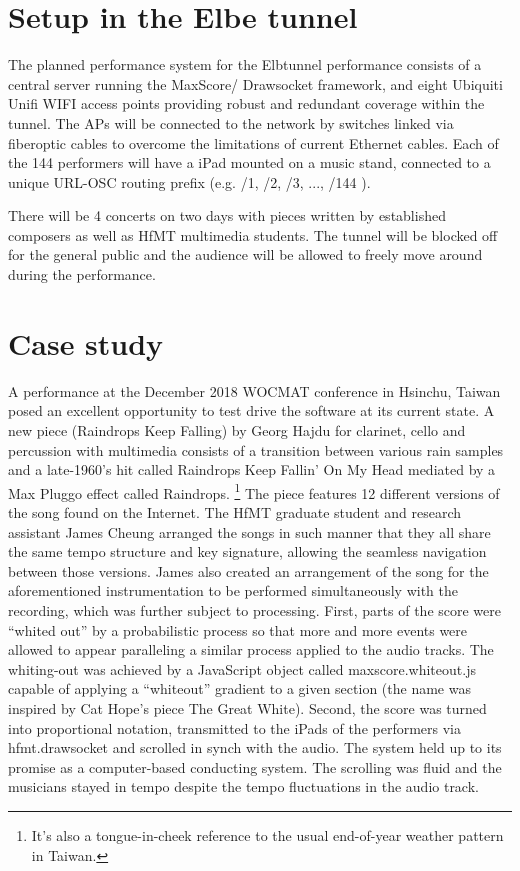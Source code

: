 \section{Setup in the Elbe tunnel}
The planned performance system for the Elbtunnel performance consists of a central server running the MaxScore/ Drawsocket framework, and eight Ubiquiti Unifi WIFI access points providing robust and redundant coverage within the tunnel. The APs will be connected to the network by switches linked via fiberoptic cables to overcome the limitations of current Ethernet cables.
Each of the 144 performers will have a iPad mounted on a music stand, connected to a unique URL-OSC routing prefix (e.g. {/1}, {/2}, {/3}, ..., {/144} ). 

There will be 4 concerts on two days with pieces written by established composers as well as HfMT multimedia students. The tunnel will be blocked off for the general public and the audience will be allowed to freely move around during the performance.





\section{Case study}

A performance  at the December 2018 WOCMAT conference in Hsinchu, Taiwan posed an excellent opportunity to test drive the software at its current state.
A new piece (Raindrops Keep Falling) by Georg Hajdu for clarinet, cello and percussion with multimedia consists of a transition between various rain samples and a late-1960’s hit called Raindrops Keep Fallin' On My Head mediated by a Max Pluggo effect called Raindrops. \footnote{It’s also a tongue-in-cheek reference to the usual end-of-year weather pattern in Taiwan.} The piece features 12 different versions of the song found on the Internet. The HfMT graduate student and research assistant James Cheung arranged the songs in such manner that they all share the same tempo structure and key signature, allowing the seamless navigation between those versions. James also created an arrangement of the song for the aforementioned instrumentation to be performed simultaneously with the recording, which was further subject to processing. First, parts of the score were “whited out” by a probabilistic process so that more and more events were allowed to appear paralleling a similar process applied to the audio tracks. The whiting-out was achieved by a JavaScript object called maxscore.whiteout.js capable of applying a “whiteout” gradient to a given section (the name was inspired by Cat Hope’s piece The Great White). Second, the score was turned into proportional notation, transmitted to the iPads of the performers via hfmt.drawsocket and scrolled in synch with the audio. The system held up to its promise as a computer-based conducting system. The scrolling was fluid and the musicians stayed in tempo despite the tempo fluctuations in the audio track. 





